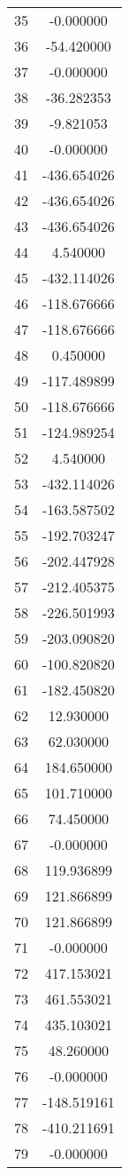 \documentclass[12pt]{article}
\begin{document}
\begin{longtable}{@{}cc@{}}
35 & -0.000000 \\
36 & -54.420000 \\
37 & -0.000000 \\
38 & -36.282353 \\
39 & -9.821053 \\
40 & -0.000000 \\
41 & -436.654026 \\
42 & -436.654026 \\
43 & -436.654026 \\
44 & 4.540000 \\
45 & -432.114026 \\
46 & -118.676666 \\
47 & -118.676666 \\
48 & 0.450000 \\
49 & -117.489899 \\
50 & -118.676666 \\
51 & -124.989254 \\
52 & 4.540000 \\
53 & -432.114026 \\
54 & -163.587502 \\
55 & -192.703247 \\
56 & -202.447928 \\
57 & -212.405375 \\
58 & -226.501993 \\
59 & -203.090820 \\
60 & -100.820820 \\
61 & -182.450820 \\
62 & 12.930000 \\
63 & 62.030000 \\
64 & 184.650000 \\
65 & 101.710000 \\
66 & 74.450000 \\
67 & -0.000000 \\
68 & 119.936899 \\
69 & 121.866899 \\
70 & 121.866899 \\
71 & -0.000000 \\
72 & 417.153021 \\
73 & 461.553021 \\
74 & 435.103021 \\
75 & 48.260000 \\
76 & -0.000000 \\
77 & -148.519161 \\
78 & -410.211691 \\
79 & -0.000000 \\

\end{longtable}
\end{document}
